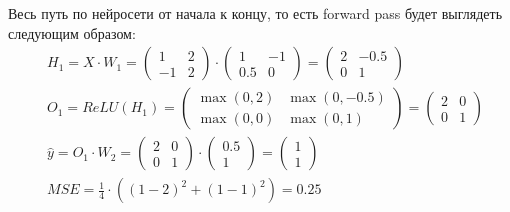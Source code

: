 \begin{sol}
Весь путь по нейросети от начала к концу, то есть forward pass будет выглядеть следующим образом: 
\begin{equation*}
    \begin{aligned} 
    & H_1 = X \cdot W_1 = \begin{pmatrix} 1 & 2 \\ -1 & 2 \end{pmatrix} \cdot \begin{pmatrix} 1 & -1 \\ 0.5 & 0 \end{pmatrix} =  \begin{pmatrix} 2 & -0.5 \\ 0 & 1 \end{pmatrix} \\
    & O_1 = ReLU(H_1) = \begin{pmatrix} \max(0,2) & \max(0,-0.5) \\ \max(0,0) & \max(0,1) \end{pmatrix} = \begin{pmatrix} 2 & 0 \\ 0 & 1 \end{pmatrix} \\
    & \hat{y} = O_1 \cdot W_2 = \begin{pmatrix} 2 & 0 \\ 0 & 1 \end{pmatrix} \cdot \begin{pmatrix} 0.5 \\ 1 \end{pmatrix} = \begin{pmatrix} 1 \\ 1 \end{pmatrix} \\ 
    & MSE = \frac{1}{4} \cdot ((1 - 2)^2 + (1 - 1)^2) = 0.25
    \end{aligned}
\end{equation*}


\end{sol}
